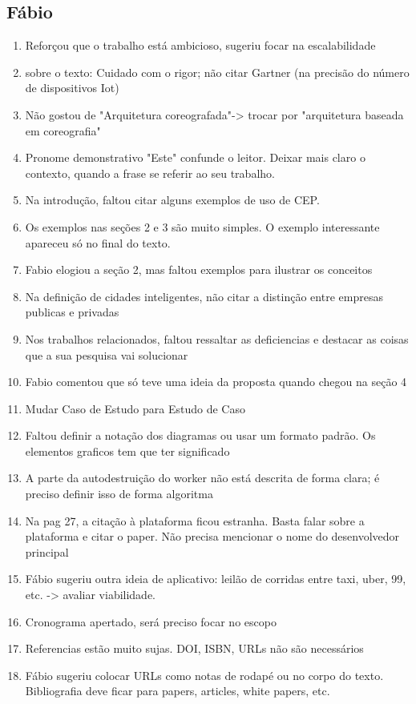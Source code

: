 \subsection{Fábio}
\begin{enumerate}
\item Reforçou que o trabalho está ambicioso, sugeriu focar na escalabilidade
\item sobre o texto: Cuidado com o rigor; não citar Gartner (na precisão do número de dispositivos Iot)
\item Não gostou de "Arquitetura coreografada"-> trocar por "arquitetura baseada em coreografia"
\item Pronome demonstrativo "Este" confunde o leitor. Deixar mais claro o contexto, quando a frase se referir ao seu trabalho.
\item Na introdução, faltou citar alguns exemplos de uso de CEP.
\item Os exemplos nas seções 2 e 3 são muito simples. O exemplo interessante apareceu só no final do texto.
\item Fabio elogiou a seção 2, mas faltou exemplos para ilustrar os conceitos
\item Na definição de cidades inteligentes, não citar a distinção entre empresas publicas e privadas
\item Nos trabalhos relacionados, faltou ressaltar as deficiencias e destacar as coisas que a sua pesquisa vai solucionar
\item Fabio comentou que só teve uma ideia da proposta quando chegou na seção 4
\item Mudar Caso de Estudo para Estudo de Caso
\item Faltou definir a notação dos diagramas ou usar um formato padrão. Os elementos graficos tem que ter significado
\item A parte da autodestruição do worker não está descrita de forma clara; é preciso definir isso de forma algoritma
\item Na pag 27, a citação à plataforma ficou estranha. Basta falar sobre a plataforma e citar o paper. Não precisa mencionar o nome do desenvolvedor principal
\item Fábio sugeriu outra ideia de aplicativo: leilão de corridas entre taxi, uber, 99, etc. -> avaliar viabilidade.
\item Cronograma apertado, será preciso focar no escopo 
\item Referencias estão muito sujas. DOI, ISBN, URLs não são necessários
\item Fábio sugeriu colocar URLs como notas de rodapé ou no corpo do texto. Bibliografia deve ficar para papers, articles, white papers, etc.
\end{enumerate}

